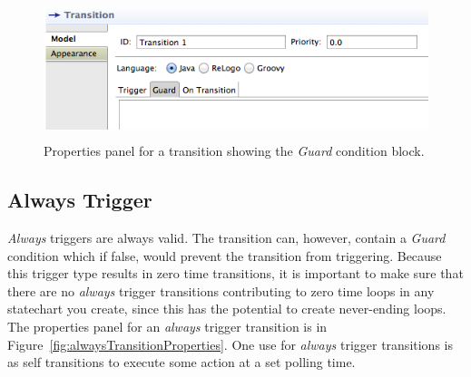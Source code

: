 \documentclass[11pt]{amsart}
\begin{document}
\begin{figure}
\begin{center}
\vspace{.2in}
\centerline {
\includegraphics[height=1.6in]{StatechartsImages/TransitionPropertiesGuard.png}
}
\caption{Properties panel for a transition showing the \emph{Guard} condition block.}
\label{fig:transitionPropertiesGuard}
\end{center}

\end{figure}


%
%
\clearpage

\subsection{Always Trigger}
\label{sec:alwaysTransition}
\emph{Always} triggers are always valid. The transition can, however, contain a \emph{Guard} condition which if false, would prevent the transition from triggering. Because this trigger type results in zero time transitions, it is important to make sure that there are no \emph{always} trigger transitions contributing to zero time loops in any statechart you create, since this has the potential to create never-ending loops. The properties panel for an \emph{always} trigger transition is in Figure~\ref{fig:alwaysTransitionProperties}. One use for \emph{always} trigger transitions is as self transitions to execute some action at a set polling time.
\end{document}
